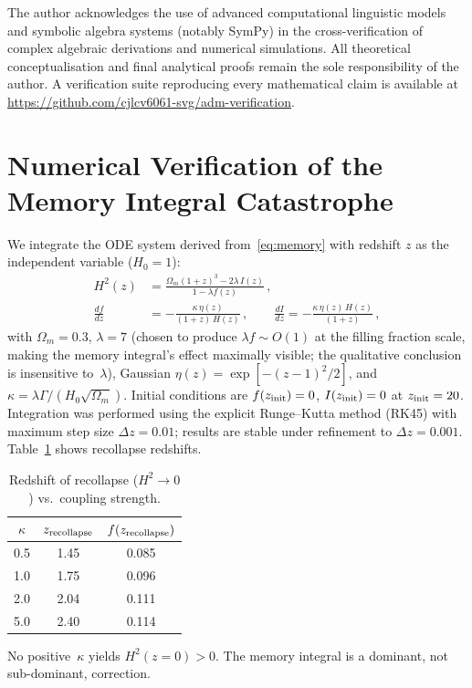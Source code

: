 \documentclass[12pt,a4paper]{article}
\theoremstyle{remark}
\begin{document}
The author acknowledges the use of advanced computational linguistic models and symbolic algebra systems (notably SymPy) in the cross-verification of complex algebraic derivations and numerical simulations.
All theoretical conceptualisation and final analytical proofs remain the sole responsibility of the author.
A verification suite reproducing every mathematical claim is available at \url{https://github.com/cjlcv6061-svg/adm-verification}.


\appendix
\section{Numerical Verification of the Memory Integral Catastrophe}

We integrate the ODE system derived from~\eqref{eq:memory} with redshift $z$ as the independent variable ($H_0=1$):
\begin{align}
H^2(z) &= \frac{\Omega_m(1+z)^3 - 2\lambda\,I(z)}{1-\lambda f(z)}\,,\\
\frac{df}{dz} &= -\frac{\kappa\,\eta(z)}{(1+z)\,H(z)}\,,\qquad
\frac{dI}{dz} = -\frac{\kappa\,\eta(z)\,H(z)}{(1+z)}\,,
\end{align}
with $\Omega_m=0.3$, $\lambda=7$ (chosen to produce $\lambda f \sim O(1)$ at the filling fraction scale, making the memory integral's effect maximally visible; the qualitative conclusion is insensitive to~$\lambda$), Gaussian $\eta(z) = \exp[-(z-1)^2/2]$, and $\kappa = \lambda\Gamma/(H_0\sqrt{\Omega_m})$.
Initial conditions are $f(z_{\rm init}) = 0$, $I(z_{\rm init}) = 0$ at $z_{\rm init} = 20$.
Integration was performed using the explicit Runge--Kutta method (RK45) with maximum step size $\Delta z = 0.01$; results are stable under refinement to $\Delta z = 0.001$.
Table~\ref{tab:recollapse} shows recollapse redshifts.

\begin{table}[h]
\centering
\caption{Redshift of recollapse ($H^2\to 0$) vs.\ coupling strength.}
\label{tab:recollapse}
\begin{tabular}{ccc}
\toprule
$\kappa$ & $z_{\rm recollapse}$ & $f(z_{\rm recollapse})$ \\
\midrule
0.5 & 1.45 & 0.085 \\
1.0 & 1.75 & 0.096 \\
2.0 & 2.04 & 0.111 \\
5.0 & 2.40 & 0.114 \\
\bottomrule
\end{tabular}
\end{table}

No positive~$\kappa$ yields $H^2(z=0)>0$.
The memory integral is a dominant, not sub-dominant, correction.




\end{document}
